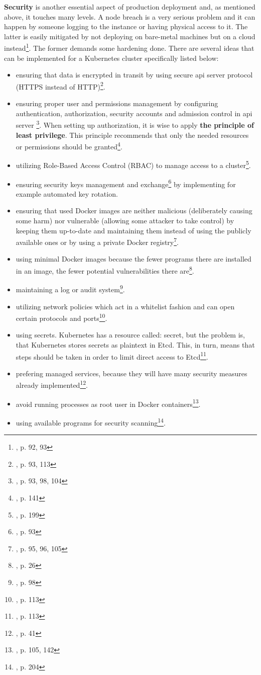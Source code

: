 \textbf{Security} is another essential aspect of production deployment and, as mentioned above, it touches many levels. A node breach is a very serious problem and it can happen by someone logging to the instance or having physical access to it. The latter is easily mitigated by not deploying on bare-metal machines but on a cloud instead\footnote{\cite{book-mastering-k8s}, p. 92, 93}. The former demands some hardening done. There are several ideas that can be implemented for a Kubernetes cluster specifically listed below:
\begin{itemize}
\item ensuring that data is encrypted in transit by using secure api server protocol (HTTPS instead of HTTP)\footnote{\cite{book-mastering-k8s}, p. 93, 113}.
\item ensuring proper user and permissions management by configuring authentication, authorization, security accounts and admission control in api server \footnote{\cite{book-mastering-k8s}, p. 93, 98, 104}. When setting up authorization, it is wise to apply \textbf{the principle of least privilege}. This principle recommends that only the needed resources or permissions should be granted\footnote{\cite{book-cndwk}, p. 141}.
\item utilizing Role-Based Access Control (RBAC) to manage access to a cluster\footnote{\cite{book-cndwk}, p. 199}.
\item ensuring security keys management and exchange\footnote{\cite{book-mastering-k8s}, p. 93} by implementing for example automated key rotation.
\item ensuring that used Docker images are neither malicious (deliberately causing some harm) nor vulnerable (allowing some attacker to take control) by keeping them up-to-date and maintaining them instead of using the publicly available ones or by using a private Docker registry\footnote{\cite{book-mastering-k8s}, p. 95, 96, 105}.
\item using minimal Docker images because the fewer programs there are installed in an image, the fewer potential vulnerabilities there are\footnote{\cite{book-cndwk}, p. 26}.
\item maintaining a log or audit system\footnote{\cite{book-mastering-k8s}, p. 98}.
\item utilizing network policies which act in a whitelist fashion and can open certain protocols and ports\footnote{\cite{book-mastering-k8s}, p. 113}.
\item using secrets. Kubernetes has a resource called: secret, but the problem is, that Kubernetes stores secrets as plaintext in Etcd. This, in turn, means that steps should be taken in order to limit direct access to Etcd\footnote{\cite{book-mastering-k8s}, p. 113}.
\item prefering managed services, because they will have many security measures already implemented\footnote{\cite{book-cndwk}, p. 41}.
\item avoid running processes as root user in Docker containers\footnote{\cite{book-cndwk}, p. 105, 142}.
\item using available programs for security scanning\footnote{\cite{book-cndwk}, p. 204}.
\end{itemize}


